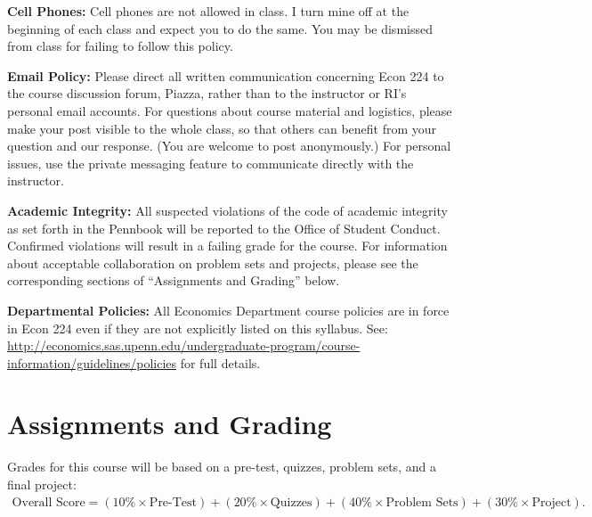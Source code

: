 \documentclass[11pt, letterpaper]{article}
\begin{document}
\medskip

\noindent \textbf{Cell Phones:} Cell phones are not allowed in class. 
I turn mine off at the beginning of each class and expect you to do the same.
You may be dismissed from class for failing to follow this policy.

\medskip

\noindent \textbf{Email Policy:}
Please direct all written communication concerning Econ 224 to the course discussion forum, Piazza, rather than to the instructor or RI's personal email accounts.
For questions about course material and logistics, please make your post visible to the whole class, so that others can benefit from your question and our response.
(You are welcome to post anonymously.)
For personal issues, use the private messaging feature to communicate directly with the instructor. 

\medskip

\noindent \textbf{Academic Integrity:} 
All suspected violations of the code of academic integrity as set forth in the Pennbook will be reported to the Office of Student Conduct. 
Confirmed violations will result in a failing grade for the course. 
For information about acceptable collaboration on problem sets and projects, please see the corresponding sections of ``Assignments and Grading'' below.

\medskip

\noindent \textbf{Departmental Policies: } 
All Economics Department course policies are in force in Econ 224 even if they are not explicitly listed on this syllabus. 
See: \url{http://economics.sas.upenn.edu/undergraduate-program/course-information/guidelines/policies} for full details. 

\medskip



\newpage

\section*{Assignments and Grading}

Grades for this course will be based on a pre-test, quizzes, problem sets, and a final project:
	\begin{equation*}
	\begin{split}
    \mbox{Overall Score} = (10\% \times \mbox{Pre-Test})  + (20\% \times \mbox{Quizzes}) + (40\% \times \mbox{Problem Sets}) +  (30\% \times \mbox{Project}).
	\end{split}
	\end{equation*}
\end{document}
